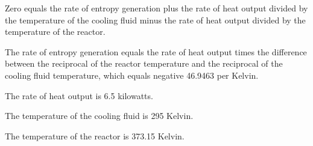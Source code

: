 Zero equals the rate of entropy generation plus the rate of heat output divided by the temperature of the cooling fluid minus the rate of heat output divided by the temperature of the reactor.

The rate of entropy generation equals the rate of heat output times the difference between the reciprocal of the reactor temperature and the reciprocal of the cooling fluid temperature, which equals negative 46.9463 per Kelvin.

The rate of heat output is 6.5 kilowatts.

The temperature of the cooling fluid is 295 Kelvin.

The temperature of the reactor is 373.15 Kelvin.